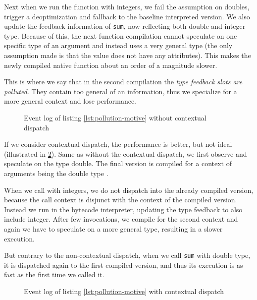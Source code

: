 Next when we run the function with integers, we fail the assumption on doubles, trigger a deoptimization and fallback to the baseline interpreted version. We also update the feedback information of \texttt{sum}, now reflecting both double and integer type. Because of this, the next function compilation cannot speculate on one specific type of an argument and instead uses a very general type (the only assumption made is that the value does not have any attributes). This makes the newly compiled native function about an order of a magnitude slower.

This is where we say that in the second compilation the \textit{type feedback slots are polluted}. They contain too general of an information, thus we specialize for a more general context and lose performance.

\begin{figure}
	\centering
	\begin{adjustwidth}{-3cm}{-3cm}
	\end{adjustwidth}
	\caption{Event log of listing \ref{lst:pollution-motive} without contextual dispatch \todo{argument \rightarrow\xspace call}}\label{fig:pollution-motive-baseline}
\end{figure}

If we consider contextual dispatch, the performance is better, but not ideal (illustrated in \ref{fig:pollution-motive-context}). Same as without the contextual dispatch, we first observe and speculate on the type double. The final version is compiled for a context of arguments being the double type .

When we call with integers, we do not dispatch into the already compiled version, because the call context is disjunct with the context of the compiled version. Instead we run in the bytecode interpreter, updating the type feedback to also include integer. After few invocations, we compile for the second context and again we have to speculate on a more general type, resulting in a slower execution.

But contrary to the non-contextual dispatch, when we call \texttt{sum} with double type, it is dispatched again to the first compiled version, and thus its execution is as fast as the first time we called it.

\begin{figure}
	\centering
	\begin{adjustwidth}{-3cm}{-3cm}
	\end{adjustwidth}
	\caption{Event log of listing \ref{lst:pollution-motive} with contextual dispatch}\label{fig:pollution-motive-context}
\end{figure}

